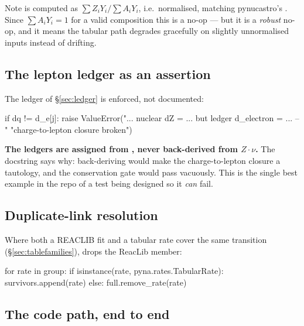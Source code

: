 Note \Ye{} is computed as $\sum Z_iY_i / \sum A_iY_i$, i.e.\ normalised,
matching pynucastro's . Since $\sum A_iY_i = 1$ for a valid
composition this is a no-op --- but it is a \emph{robust} no-op, and it means
the tabular path degrades gracefully on slightly unnormalised inputs instead of
drifting.

\subsection{The lepton ledger as an assertion}
\label{sec:ledger-enforcement}

The ledger of \S\ref{sec:ledger} is enforced, not documented:

\begin{srclisting}
if dq != d_e[j]:
    raise ValueError("... nuclear dZ = ... but ledger d_electron = ... -- "
                     "charge-to-lepton closure broken")
\end{srclisting}

\begin{result}
\textbf{The ledgers are assigned from , never back-derived from
$Z\cdot\nu$.} The docstring says why: back-deriving would make the
charge-to-lepton closure a tautology, and the conservation gate would pass
vacuously. This is the single best example in the repo of a test being designed
so it \emph{can} fail.
\end{result}

\subsection{Duplicate-link resolution}
\label{sec:duplicate-links}

Where both a REACLIB fit and a tabular rate cover the same transition
(\S\ref{sec:tablefamilies}),  drops the ReacLib
member:

\begin{srclisting}
for rate in group:
    if isinstance(rate, pyna.rates.TabularRate): survivors.append(rate)
    else: full.remove_rate(rate)
\end{srclisting}

\subsection{The code path, end to end}
\label{sec:codepath}

